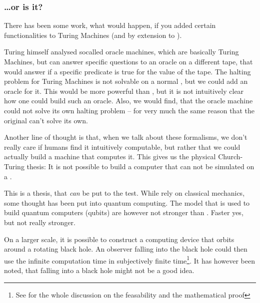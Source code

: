 \subsubsection{\dots or is it?}
There has been some work, what would happen, if you added certain 
functionalities to Turing Machines (and by extension to \WHILE). 

Turing himself analysed socalled oracle machines, which are basically Turing 
Machines, but can answer specific questions to an oracle on a different tape, 
that would answer if a specific predicate is true for the value of the tape.
The halting problem for Turing Machines is not solvable on a normal \TM, but 
we could add an oracle for it. This would be more powerful than \TM, but it 
is not intuitively clear how one could build such an oracle. Also, we would 
find, that the oracle machine could not solve its own halting problem -- for 
very much the same reason that the original \TM can't solve its own.

Another line of thought is that, when we talk about these formalisms, we 
don't really care if humans find it intuitively computable, but rather that 
we could actually build a machine that computes it. This gives us the 
physical Church-Turing thesis: It is not possible to build a computer that 
can not be simulated on a \TM.

This is a thesis, that {\em can} be put to the test. While \TM rely on 
classical mechanics, some thought has been put into quantum computing. The 
model that is used to build quantum computers (qubits) are however not 
stronger than \TM. Faster yes, but not really stronger.

On a larger scale, it is possible to construct a computing device that orbits 
around a rotating black hole. An observer falling into the black hole could 
then use the infinite computation time in subjectively finite 
time\footnote{See \cite{etesi2002blackhole} for the whole discussion on the 
feasability and the mathematical proof}. It has however been noted, that
falling into a black hole might not be a good idea\citationneeded.


